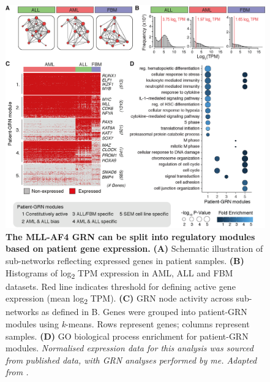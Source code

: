 \begin{figure}[!t]
    \centering
    \includegraphics[width=\textwidth,height=\textheight,keepaspectratio]{figures/chapter4/ch4_patient.png}
    \caption[{The MLL-AF4 GRN can be split into regulatory modules based on patient gene expression.}]
    {\textbf{The MLL-AF4 GRN can be split into regulatory modules based on patient gene expression.} 
    \textbf{(A)} Schematic illustration of sub-networks reflecting expressed genes in patient samples. 
    \textbf{(B)} Histograms of log\textsubscript{2} TPM expression in AML, ALL and FBM datasets. Red line indicates threshold for defining active gene expression (mean log\textsubscript{2} TPM). 
    \textbf{(C)} GRN node activity across sub-networks as defined in B. Genes were grouped into patient-GRN modules using \textit{k}-means. Rows represent genes; columns represent samples. 
    \textbf{(D)} GO biological process enrichment for patient-GRN modules. 
    \textit{Normalised expression data for this analysis was sourced from published data, with GRN analyses performed by me. Adapted from \cite{harman_kmt2a-aff1_2021}.}
    }
    \label{fig:ch4_patient}
\end{figure}

